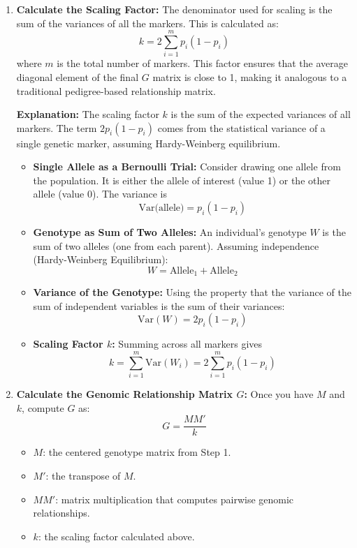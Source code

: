\documentclass[12pt]{article}
\begin{document}
\begin{enumerate}
    \item \textbf{Calculate the Scaling Factor:}
    The denominator used for scaling is the sum of the variances of all the markers. This is calculated as:
    \[
    k = 2 \sum_{i=1}^{m} p_{i}(1 - p_{i})
    \]
    where $m$ is the total number of markers. This factor ensures that the average diagonal element of the final $G$ matrix is close to 1, making it analogous to a traditional pedigree-based relationship matrix.

    \textbf{Explanation:} The scaling factor $k$ is the sum of the expected variances of all markers. The term $2p_i(1-p_i)$ comes from the statistical variance of a single genetic marker, assuming Hardy-Weinberg equilibrium.

    \begin{itemize}
        \item \textbf{Single Allele as a Bernoulli Trial:}
        Consider drawing one allele from the population. It is either the allele of interest (value 1) or the other allele (value 0). The variance is
        \[
        \text{Var(allele)} = p_i(1-p_i)
        \]

        \item \textbf{Genotype as Sum of Two Alleles:}
        An individual's genotype $W$ is the sum of two alleles (one from each parent). Assuming independence (Hardy-Weinberg Equilibrium):
        \[
        W = \text{Allele}_1 + \text{Allele}_2
        \]

        \item \textbf{Variance of the Genotype:}
        Using the property that the variance of the sum of independent variables is the sum of their variances:
        \[
        \text{Var}(W) = 2 p_i(1-p_i)
        \]

        \item \textbf{Scaling Factor $k$:}
        Summing across all markers gives
        \[
        k = \sum_{i=1}^{m} \text{Var}(W_i) = 2 \sum_{i=1}^{m} p_i(1-p_i)
        \]
    \end{itemize}

    \item \textbf{Calculate the Genomic Relationship Matrix $G$:}
    Once you have $M$ and $k$, compute $G$ as:
    \[
    G = \frac{M M'}{k}
    \]
    \begin{itemize}
        \item $M$: the centered genotype matrix from Step 1.
        \item $M'$: the transpose of $M$.
        \item $M M'$: matrix multiplication that computes pairwise genomic relationships.
        \item $k$: the scaling factor calculated above.
    \end{itemize}


\end{enumerate}
\end{document}
